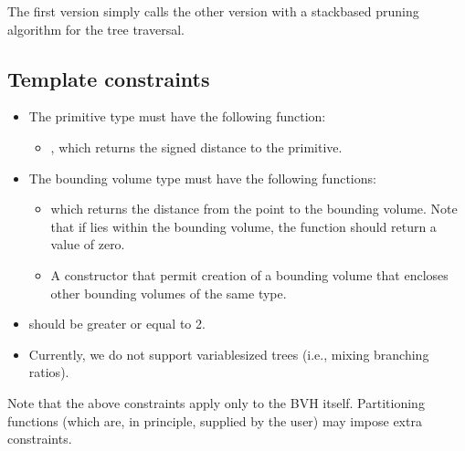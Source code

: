\documentclass[letterpaper,10pt,english]{sphinxmanual}
\begin{document}
\sphinxAtStartPar
The first version simply calls the other version with a stack\sphinxhyphen{}based pruning algorithm for the tree traversal.


\subsection{Template constraints}
\label{\detokenize{ImplemBVH:template-constraints}}\label{\detokenize{ImplemBVH:chap-bvhconstraints}}\begin{itemize}
\item {} 
\sphinxAtStartPar
The primitive type  must have the following function:
\begin{itemize}
\item {} 
\sphinxAtStartPar
{}, which returns the signed distance to the primitive.

\end{itemize}

\item {} 
\sphinxAtStartPar
The bounding volume type  must have the following functions:
\begin{itemize}
\item {} 
\sphinxAtStartPar
{} which returns the distance from the point  to the bounding volume.
Note that if  lies within the bounding volume, the function should return a value of zero.

\item {} 
\sphinxAtStartPar
A constructor  that permit creation of a bounding volume that encloses other bounding volumes of the same type.

\end{itemize}

\item {} 
\sphinxAtStartPar
{} should be greater or equal to 2.

\item {} 
\sphinxAtStartPar
Currently, we do not support variable\sphinxhyphen{}sized trees (i.e., mixing branching ratios).

\end{itemize}

\sphinxAtStartPar
Note that the above constraints apply only to the BVH itself.
Partitioning functions (which are, in principle, supplied by the user) may impose extra constraints.
\end{document}
